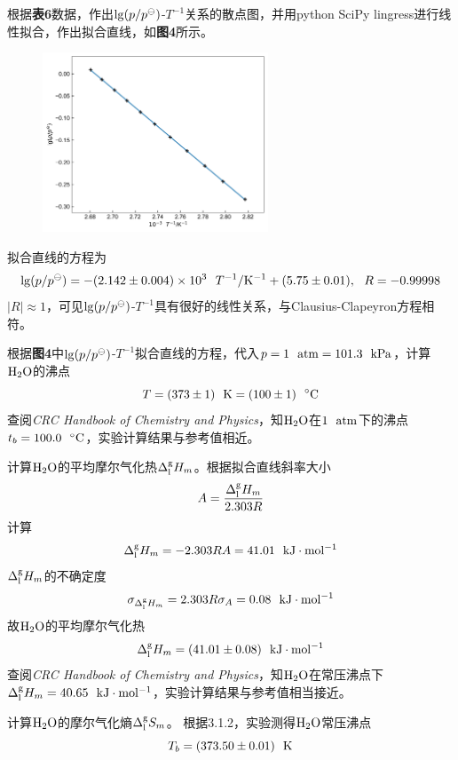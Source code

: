 \documentclass[12pt]{article}
\begin{document}
根据\textbf{表6}数据，作出${\rm lg}(p/p^{\ominus})$-$T^{-1}$关系的散点图，并用python SciPy lingress进行线性拟合，作出拟合直线，如\textbf{图4}所示。
\begin{figure}[h]
	\centering
	\includegraphics[width=0.6\textwidth]{4.jpg}
\end{figure}
\par
拟合直线的方程为
$$
{\rm lg}(p/p^{\ominus})=-(2.142\pm 0.004)\times 10^{3} \ \ T^{-1}/{\rm K^{-1}}+(5.75\pm 0.01),\   \  R=-0.99998
$$
$|R|\approx 1$，可见${\rm lg}(p/p^{\ominus})$-$T^{-1}$具有很好的线性关系，与Clausius-Clapeyron方程相符。\par 
根据\textbf{图4}中${\rm lg}(p/p^{\ominus})$-$T^{-1}$拟合直线的方程，代入$p=1\ \ {\rm atm}=101.3\ \ {\rm kPa}$，计算$\rm H_{2}O$的沸点
$$
T=(373\pm 1)\ \ {\rm K}=(100\pm 1)\ \ {\rm ^{\circ}C}  
$$
查阅\textit{CRC Handbook of Chemistry and Physics}\citealp{crc}，知$\rm H_{2}O$在$\rm 1\ \ atm$下的沸点$t_{b}=100.0\ \ {\rm ^{\circ}C}$，实验计算结果与参考值相近。\par 
计算$\rm H_{2}O$的平均摩尔气化热$\Delta^{\rm g}_{\rm l}H_{m}$。根据拟合直线斜率大小
$$
A=\frac{\Delta^{\rm g}_{\rm l}H_{m}}{2.303R}
$$
计算
$$
\Delta^{\rm g}_{\rm l}H_{m}=-2.303RA=41.01\ \ {\rm kJ\cdot mol^{-1}}
$$
$\Delta^{\rm g}_{\rm l}H_{m}$的不确定度
$$
\sigma_{\Delta^{\rm g}_{\rm l}H_{m}}=2.303R\sigma_{A}=0.08\ \ {\rm kJ\cdot mol^{-1}}
$$
故$\rm H_{2}O$的平均摩尔气化热
$$
\Delta^{\rm g}_{\rm l}H_{m}=(41.01\pm 0.08)\ \ {\rm kJ\cdot mol^{-1}}
$$
查阅\textit{CRC Handbook of Chemistry and Physics}\citealp{crc}，知$\rm H_{2}O$在常压沸点下$\Delta^{\rm g}_{\rm l}H_{m}=40.65\ \ {\rm kJ\cdot mol^{-1}}$，实验计算结果与参考值相当接近。
\par
计算$\rm H_{2}O$的摩尔气化熵$\Delta^{\rm g}_{\rm l}S_{m}$。
根据3.1.2，实验测得$\rm H_{2}O$常压沸点
$$
T_{b}=(373.50\pm 0.01)\ \ {\rm K}
$$
\end{document}
